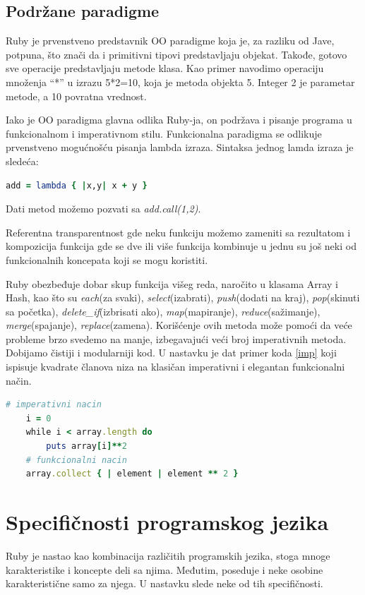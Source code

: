 \documentclass[a4paper]{article}
\begin{document}
\subsection{Podržane paradigme}
Ruby je prvenstveno predstavnik OO paradigme koja je, za razliku od Jave, potpuna, što znači da i primitivni tipovi predstavljaju objekat. Takođe, gotovo sve operacije predstavljaju metode klasa. Kao primer navodimo operaciju množenja “*” u izrazu 5*2=10, koja je metoda objekta 5. Integer 2 je parametar metode, a 10 povratna vrednost.

Iako je OO paradigma glavna odlika Ruby-ja, on podržava i pisanje programa u funkcionalnom i imperativnom stilu. Funkcionalna paradigma se odlikuje prvenstveno mogućnošću pisanja lambda izraza. Sintaksa jednog lamda izraza je sledeća:
\begin{lstlisting}[language=Ruby]
	add = lambda { |x,y| x + y }
\end{lstlisting}\vspace*{-15pt}
Dati metod možemo pozvati sa \emph{add.call(1,2)}.

Referentna transparentnost gde neku funkciju možemo zameniti sa rezultatom i kompozicija funkcija gde se dve ili više funkcija kombinuje u jednu su još neki od funkcionalnih koncepata koji se mogu koristiti.

Ruby obezbeđuje dobar skup funkcija višeg reda, naročito u klasama Array i Hash, kao što su \emph{each}(za svaki), \emph{select}(izabrati), \emph{push}(dodati na kraj), \emph{pop}(skinuti sa početka), \emph{delete\_if}(izbrisati ako), \emph{map}(mapiranje), \emph{reduce}(sažimanje), \emph{merge}(spajanje), \emph{replace}(zamena). Korišćenje ovih metoda može pomoći da veće probleme brzo svedemo na manje, izbegavajući veći broj imperativnih metoda. Dobijamo čistiji i modularniji kod. U nastavku je dat primer koda \ref{imp} koji ispisuje kvadrate članova niza na klasičan imperativni i elegantan funkcionalni način.
\begin{lstlisting}[language=Ruby, caption={Primer koda}, frame=single, label=imp]
	# imperativni nacin
	i = 0
	while i < array.length do 				
		puts array[i]**2	
	# funkcionalni nacin
	array.collect { | element | element ** 2 }	
\end{lstlisting}\vspace*{-15pt}
\section{Specifičnosti programskog jezika}
Ruby je nastao kao kombinacija različitih programskih jezika, stoga mnoge karakteristike i koncepte deli sa njima. Međutim, poseduje i neke osobine karakteristične samo za njega. U nastavku slede neke od tih specifičnosti.
\end{document}
